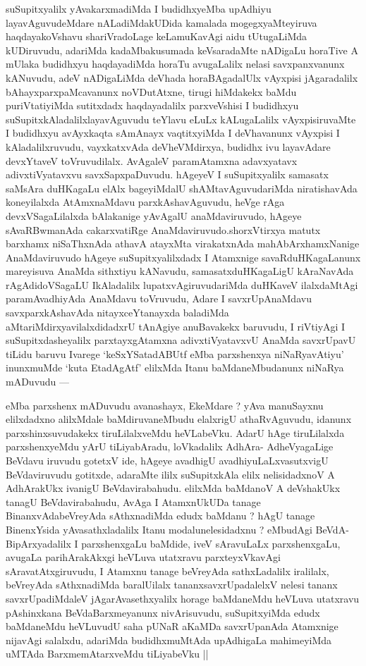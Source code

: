 \begin{artha}
suSupitxyalilx yAvakarxmadiMda I budidhxyeMba upAdhiyu
layavAguvudeMdare nALadiMdakUDida kamalada mogegxyaMteyiruva
haqdayakoVshavu shariVradoLage keLamuKavAgi aidu tUtugaLiMda
kUDiruvudu, adariMda kadaMbakusumada keVsaradaMte nADigaLu horaTive A
mUlaka budidhxyu haqdayadiMda horaTu avugaLalilx nelasi savxpanxvanunx
kANuvudu, adeV nADigaLiMda deVhada horaBAgadalUlx vAyxpisi
jAgaradalilx bAhayxparxpaMcavanunx noVDutAtxne, tirugi hiMdakekx baMdu
puriVtatiyiMda sutitxdadx haqdayadalilx parxveVshisi I budidhxyu
suSupitxkAladalilxlayavAguvudu teYlavu eLuLx kALugaLalilx
vAyxpisiruvaMte I budidhxyu avAyxkaqta sAmAnayx vaqtitxyiMda I
deVhavanunx vAyxpisi I kAladalilxruvudu, vayxkatxvAda deVheVMdirxya,
budidhx ivu layavAdare devxYtaveV toVruvudilalx. AvAgaleV paramAtamxna
adavxyatavx adivxtiVyatavxvu savxSapxpaDuvudu. hAgeyeV I suSupitxyalilx
samasatx saMsAra duHKagaLu elAlx bageyiMdalU shAMtavAguvudariMda
niratishavAda koneyilalxda AtAmxnaMdavu parxkAshavAguvudu, heVge rAga
devxVSagaLilalxda bAlakanige yAvAgalU  anaMdaviruvudo, hAgeye
sAvaRBwmanAda cakarxvatiRge AnaMdaviruvudo.shorxVtirxya  matutx
barxhamx niSaThxnAda athavA atayxMta virakatxnAda 
mahAbArxhamxNanige AnaMdaviruvudo hAgeye suSupitxyalilxdadx I
Atamxnige savaRduHKagaLanunx mareyisuva AnaMda sithxtiyu kANavudu,
samasatxduHKagaLigU kAraNavAda rAgAdidoVSagaLU IkAladalilx
lupatxvAgiruvudariMda duHKaveV ilalxdaMtAgi paramAvadhiyAda AnaMdavu
toVruvudu, Adare I savxrUpAnaMdavu savxparxkAshavAda nitayxceYtanayxda
baladiMda aMtariMdirxyavilalxdidadxrU tAnAgiye anuBavakekx baruvudu, I
riVtiyAgi I suSupitxdasheyalilx parxtayxgAtamxna adivxtiVyatavxvU AnaMda
savxrUpavU tiLidu baruvu Ivarege `keSxYSatadABUtf eMba parxshenxya
niNaRyavAtiyu' inunxmuMde `kuta EtadAgAtf' elilxMda Itanu
baMdaneMbudanunx niNaRya mADuvudu  {\rm ---} 
\end{artha}


\begin{artha}
eMba parxshenx mADuvudu avanashayx, EkeMdare ? yAva manuSayxnu
elilxdadxno alilxMdale baMdiruvaneMbudu elalxrigU athaRvAguvudu,
idanunx parxshinxsuvudakekx tiruLilalxveMdu heVLabeVku. AdarU hAge
tiruLilalxda parxshenxyeMdu yArU tiLiyabAradu, loVkadalilx AdhAra-
AdheVyagaLige BeVdavu iruvudu gotetxV ide, hAgeye avadhigU
avadhiyuLaLxvasutxvigU BeVdaviruvudu gotitxde, adaraMte ililx suSupitxkAla
elilx nelisidadxnoV A AdhArakUkx ivanigU BeVdavirabahudu. elilxMda
baMdanoV A deVshakUkx tanagU BeVdavirabahudu, AvAga  I AtamxnUkUDa
tanage BinanxvAdabeVreyAda sAthxnadiMda edudx baMdanu ? hAgU tanage
BinenxYsida yAvasathxladalilx Itanu modalunelesidadxnu ? eMbudAgi BeVdA-BipArxyadalilx I parxshenxgaLu baMdide, iveV sAravuLaLx
parxshenxgaLu, avugaLa parihArakAkxgi heVLuva utatxravu
parxteyxVkavAgi sAravatAtxgiruvudu, I Atamxnu tanage beVreyAda
sathxLadalilx iralilalx, beVreyAda sAthxnadiMda baralUilalx
tananxsavxrUpadalelxV nelesi tananx savxrUpadiMdaleV
jAgarAvasethxyalilx horage baMdaneMdu heVLuva utatxravu pAshinxkana
BeVdaBarxmeyanunx nivArisuvudu, suSupitxyiMda edudx baMdaneMdu
heVLuvudU saha pUNaR aKaMDa savxrUpanAda Atamxnige nijavAgi salalxdu,
adariMda budidhxmuMtAda upAdhigaLa mahimeyiMda uMTAda
BarxmemAtarxveMdu tiLiyabeVku ||
\end{artha}

